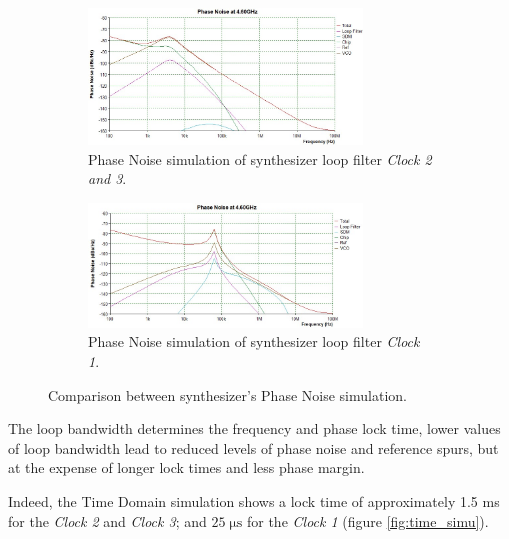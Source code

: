 \documentclass[a4paper,12pt]{article}
\begin{document}
\begin{figure}[!h]
\centering
\begin{subfigure}[b]{\textwidth}
\centering
\includegraphics[width=0.8\textwidth]{Images/freq_simu_1.jpg}
\captionsetup{justification=centering}
\caption{Phase Noise simulation of synthesizer loop filter \textit{Clock 2 and 3}.}
\end{subfigure}
\newline
\begin{subfigure}[b]{\textwidth}
\centering
\includegraphics[width=0.8\textwidth]{Images/freq_simu_2.jpg}
\captionsetup{justification=centering}
\caption{Phase Noise simulation of synthesizer loop filter \textit{Clock 1}.}
\end{subfigure}
\caption{Comparison between synthesizer's Phase Noise simulation.} 
\label{fig:simulation_1}
\end{figure}

The loop bandwidth determines the frequency and phase lock time, lower values of loop bandwidth lead to reduced levels of phase noise and reference spurs, but at the expense of longer lock times and less phase margin.\cite{pll}

Indeed, the Time Domain simulation shows a lock time of approximately 1.5 ms for the \textit{Clock 2} and \textit{Clock 3}; and $25\; \mathrm{\mu s}$ for the \textit{Clock 1} (figure \ref{fig:time_simu}). 
\end{document}
